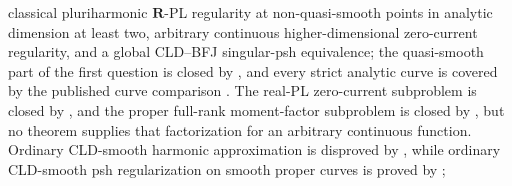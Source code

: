 \item classical pluriharmonic \(\mathbf R\)-PL regularity at non-quasi-smooth points
  in analytic dimension at least two, arbitrary continuous
  higher-dimensional zero-current regularity, and a global CLD--BFJ
  singular-psh equivalence; the quasi-smooth part of the first question is
  closed by , and every strict analytic
  curve is covered by the published curve comparison
  \cite[\S4.1.2 and Proposition~3.15]{GR25Classical}.  The real-PL
  zero-current subproblem is closed by
  , and the proper full-rank
  moment-factor subproblem is closed by
  , but no theorem supplies that
  factorization for an arbitrary continuous function.  Ordinary CLD-smooth
  harmonic approximation is disproved by
  , while ordinary
  CLD-smooth psh regularization on smooth proper curves is proved by
  ;
